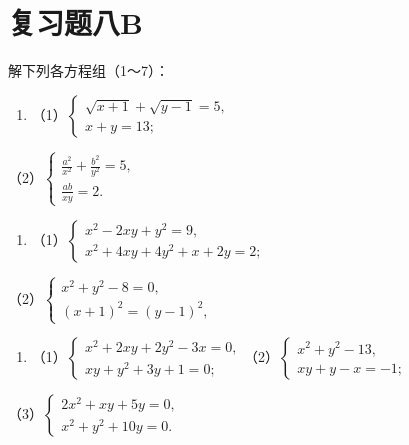 \section{复习题八B}

解下列各方程组（1～7）：

\begin{enumerate}
\item
  （1）\(\left\{ \begin{array}{l} \sqrt{x + 1} + \sqrt{y - 1} = 5, \\ x + y = 13; \end{array} \right.\)
\end{enumerate}

（2）\(\left\{ \begin{array}{l} \frac{a^2}{x^2} + \frac{b^2}{y^2} = 5, \\ \frac{ab}{xy} = 2. \end{array} \right.\)

\begin{enumerate}[start=2]
\item
  （1）\(\left\{ \begin{array}{l} x^{2} - 2xy + y^{2} = 9, \\ x^{2} + 4xy + 4y^{2} + x + 2y = 2; \end{array} \right.\)
\end{enumerate}

（2）\(\left\{ \begin{array}{l} x^{2} + y^{2} - 8 = 0, \\ (x + 1)^{2} = (y - 1)^{2}, \end{array} \right.\)

\begin{enumerate}[start=3]
\item
  （1）\(\left\{ \begin{array}{l} x^{2} + 2xy + 2y^{2} - 3x = 0, \\ xy + y^{2} + 3y + 1 = 0; \end{array} \right.\)（2）\(\left\{ \begin{array}{l} x^{2} + y^{2} - 13, \\ xy + y - x = -1; \end{array} \right.\)
\end{enumerate}

（3）\(\left\{ \begin{array}{l} 2x^{2} + xy + 5y = 0, \\ x^{2} + y^{2} + 10y = 0. \end{array} \right.\)

